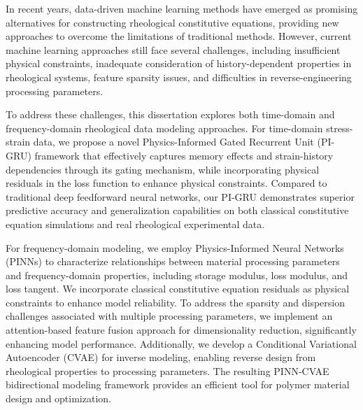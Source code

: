 In recent years, data-driven machine learning methods have emerged as promising alternatives for constructing rheological constitutive equations, providing new approaches to overcome the limitations of traditional methods. However, current machine learning approaches still face several challenges, including insufficient physical constraints, inadequate consideration of history-dependent properties in rheological systems, feature sparsity issues, and difficulties in reverse-engineering processing parameters.

To address these challenges, this dissertation explores both time-domain and frequency-domain rheological data modeling approaches. For time-domain stress-strain data, we propose a novel Physics-Informed Gated Recurrent Unit (PI-GRU) framework that effectively captures memory effects and strain-history dependencies through its gating mechanism, while incorporating physical residuals in the loss function to enhance physical constraints. Compared to traditional deep feedforward neural networks, our PI-GRU demonstrates superior predictive accuracy and generalization capabilities on both classical constitutive equation simulations and real rheological experimental data.

For frequency-domain modeling, we employ Physics-Informed Neural Networks (PINNs) to characterize relationships between material processing parameters and frequency-domain properties, including storage modulus, loss modulus, and loss tangent. We incorporate classical constitutive equation residuals as physical constraints to enhance model reliability. To address the sparsity and dispersion challenges associated with multiple processing parameters, we implement an attention-based feature fusion approach for dimensionality reduction, significantly enhancing model performance. Additionally, we develop a Conditional Variational Autoencoder (CVAE) for inverse modeling, enabling reverse design from rheological properties to processing parameters. The resulting PINN-CVAE bidirectional modeling framework provides an efficient tool for polymer material design and optimization.
